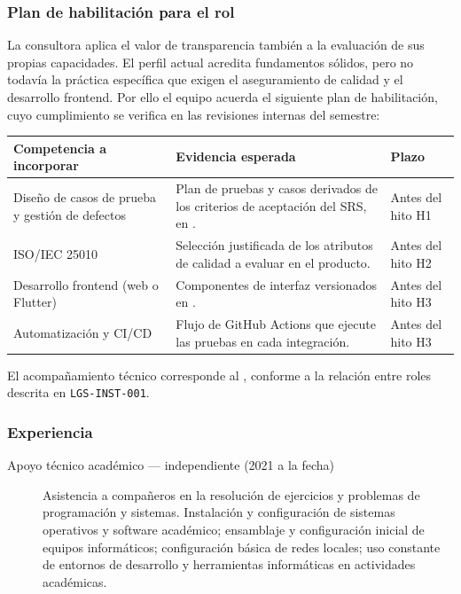 \subsubsection{Plan de habilitación para el rol}

La consultora aplica el valor de transparencia también a la evaluación de sus
propias capacidades. El perfil actual acredita fundamentos sólidos, pero no
todavía la práctica específica que exigen el aseguramiento de calidad y el
desarrollo frontend. Por ello el equipo acuerda el siguiente plan de
habilitación, cuyo cumplimiento se verifica en las revisiones internas del
semestre:

\begin{center}
\begin{tabularx}{\linewidth}{@{}L{4.4cm} Y C{2.2cm}@{}}
\toprule
\sffamily\bfseries\color{lgPrimario}Competencia a incorporar &
\sffamily\bfseries\color{lgPrimario}Evidencia esperada &
\sffamily\bfseries\color{lgPrimario}Plazo \\
\midrule
Diseño de casos de prueba y gestión de defectos & Plan de pruebas y casos derivados de los criterios de aceptación del SRS, en . & Antes del hito H1 \\
ISO/IEC 25010 & Selección justificada de los atributos de calidad a evaluar en el producto. & Antes del hito H2 \\
Desarrollo frontend (web o Flutter) & Componentes de interfaz versionados en . & Antes del hito H3 \\
Automatización y CI/CD & Flujo de GitHub Actions que ejecute las pruebas en cada integración. & Antes del hito H3 \\
\bottomrule
\end{tabularx}
\end{center}

El acompañamiento técnico corresponde al \lgArquitectoRol, conforme a la relación
entre roles descrita en \texttt{LGS-INST-001}.

\subsubsection{Experiencia}

\begin{description}
  \item[Apoyo técnico académico — independiente (2021 a la fecha)]
  Asistencia a compañeros en la resolución de ejercicios y problemas de
  programación y sistemas. Instalación y configuración de sistemas operativos y
  software académico; ensamblaje y configuración inicial de equipos informáticos;
  configuración básica de redes locales; uso constante de entornos de desarrollo
  y herramientas informáticas en actividades académicas.
\end{description}

